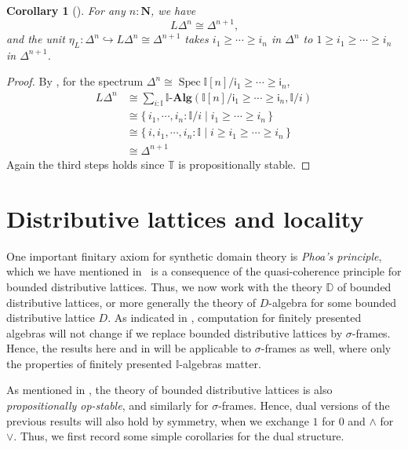 \documentclass[a4paper,12pt]{amsart}
\newtheorem{corollary}[theorem]{Corollary}
\theoremstyle{definition}
\newcommand{\mb}[1]{\mathbf{#1}}
\newcommand{\mbb}[1]{\mathbb{#1}}
\newcommand{\T}{\mbb T}
\newcommand{\I}{\mbb I}
\newcommand{\ms}[1]{\mathsf{#1}}
\newcommand{\alg}{\text{-}\mb{Alg}}
\newcommand{\scomp}[2]{\{\,#1\mid#2\,\}}
\newcommand{\hook}{\hookrightarrow}
\newcommand{\N}{\mb N}
\newcommand{\spec}{\operatorname{Spec}}
\begin{document}

\begin{corollary}[\AxiomSQCI]
  For any $n : \N$, we have
  \[ L\Delta^n \cong \Delta^{n+1}\text{,} \]
  and the unit $\eta_L \colon \Delta^n \hook L\Delta^n \cong \Delta^{n+1}$ takes $i_1 \ge \cdots \ge i_n$ in $\Delta^n$ to $1 \ge i_1 \ge \cdots \ge i_n$ in $\Delta^{n+1}$. 
\end{corollary}
\begin{proof}
  By , for the spectrum $\Delta^n \cong \spec\I[n]/\ms{i}_1 \ge \cdots \ge \ms{i}_n$,
  \begin{align*}
    L\Delta^n
    &\cong \sum_{i:\I}\I\alg(\I[n]/\ms{i}_1\ge\cdots\ge \ms{i}_n,\I/i) \\
    &\cong \scomp{i_1,\cdots,i_n:\I/i}{i_1 \ge \cdots \ge i_n} \\
    &\cong \scomp{i,i_1,\cdots,i_n:\I}{i \ge i_1 \ge \cdots \ge i_n} \\
    &\cong \Delta^{n+1}
  \end{align*}
  Again the third steps holds since $\T$ is propositionally stable.
\end{proof}

\section{Distributive lattices and locality}\label{sec:locality}

One important finitary axiom for synthetic domain theory is \emph{Phoa's principle}, which we have mentioned in~ is a consequence of the quasi-coherence principle for bounded distributive lattices. 
Thus, we now work with the theory $\mbb D$ of bounded distributive lattices, or more generally the theory of $D$-algebra for some bounded distributive lattice $D$. As indicated in , computation for finitely presented algebras 
will not change if we replace bounded distributive lattices by $\sigma$-frames. Hence, the results here and in  will be applicable to $\sigma$-frames as well, where only the properties of finitely presented $\I$-algebras matter.

As mentioned in , the theory of bounded distributive lattices is also \emph{propositionally op-stable}, and similarly for $\sigma$-frames. Hence, dual versions of the previous results will also hold by symmetry, when we exchange $1$ for $0$ and $\wedge$ for $\vee$. Thus, we first record some simple corollaries for the dual structure.
\end{document}
